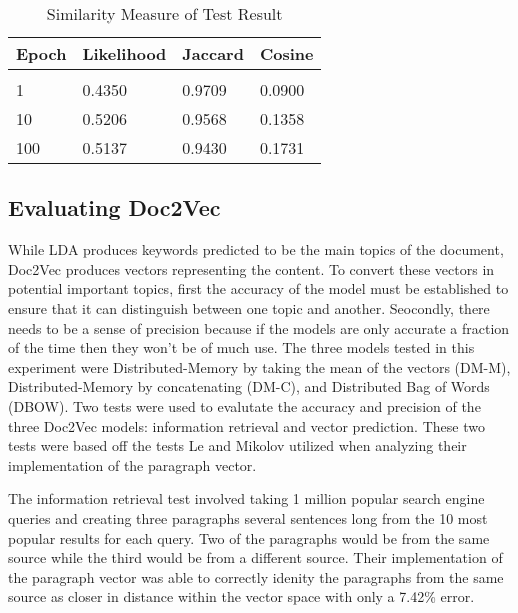 \begin{table}[!htbp]
\caption{Similarity Measure of Test Result}
\label{lda-jc}
\begin{center}
\begin{tabular}{  l  l l l}
\bf Epoch & \bf Likelihood & \bf Jaccard & \bf Cosine \\ \hline \\
1         &0.4350 & 0.9709 & 0.0900\\
10       &0.5206 & 0.9568 & 0.1358\\
100     &0.5137 &  0.9430 & 0.1731\\
\end{tabular}
\end{center}
\end{table}

\subsection{Evaluating Doc2Vec}
While LDA produces keywords predicted to be the main topics of the document, Doc2Vec produces vectors representing the content. To convert these vectors in potential important topics, first the accuracy of the model must be established to ensure that it can distinguish between one topic and another. Seocondly, there needs to be a sense of precision because if the models are only accurate a fraction of the time then they won't be of much use. The three models tested in this experiment were  Distributed-Memory by taking the mean of the vectors (DM-M), Distributed-Memory by concatenating (DM-C), and Distributed Bag of Words (DBOW). Two tests were used to evalutate the accuracy and precision of the three Doc2Vec models: information retrieval and vector prediction. These two tests were based off the tests Le and Mikolov utilized when analyzing their implementation of the paragraph vector. \cite{RefWorks:doc:5a6e5746e4b0d609eec798d7}

The information retrieval test involved taking 1 million popular search engine queries and creating three paragraphs several sentences long from the 10 most popular results for each query. Two of the paragraphs would be from the same source while the third would be from a different source. Their implementation of the paragraph vector was able to correctly idenity the paragraphs from the same source as closer in distance within the vector space with only a 7.42\% error. 

